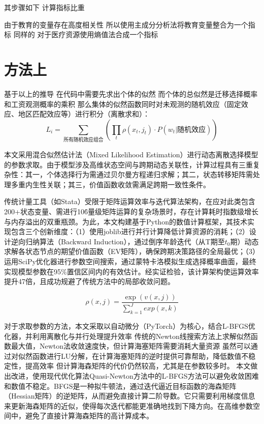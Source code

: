 \documentclass[a4paper,12pt,oneside]{book} %
\begin{document}
其步骤如下
计算指标比重


由于教育的变量存在高度相关性
所以使用主成分分析法将教育变量整合为一个指标
同样的
对于医疗资源使用熵值法合成一个指标

\section{方法上} %
\label{sub:方法上}
基于以上的推导
在代码中需要先求出个体的似然
而个体的总似然是迁移选择概率和工资观测概率的乘积
那么集体的似然函数同时对未观测的随机效应（固定效应、地区匹配效应等）进行积分（离散求和）：
\begin{equation}
  L_{i}=\sum\limits_{\text{所有随机效应组合}}(\prod_{t}\rho(x_{t},j_{t})⋅P(w_{t}|\text{随机效应}))
\end{equation}

本文采用混合似然估计法（Mixed Likelihood Estimation）进行动态离散选择模型的参数求取。由于模型涉及高维状态空间与跨期动态关联性，计算过程具有三重复杂性：其一，个体选择行为需通过贝尔曼方程递归求解；其二，状态转移矩阵需处理多重内生性关联；其三，价值函数收敛需满足跨期一致性条件。

传统计量工具（如Stata）受限于矩阵运算效率与迭代算法架构，在应对此类包含200+状态变量、需进行10\^6量级矩阵运算的复杂场景时，存在计算耗时指数级增长与内存溢出的双重瓶颈。为此，本文构建基于Python的数值计算框架，其技术实现包含三个创新维度：（1）使用joblib进行并行计算降低计算资源的消耗；（2）设计逆向归纳算法（Backward Induction），通过倒序年龄迭代（从T期至$t_0$期）动态求解各状态节点的期望价值函数（EV矩阵），确保跨期决策路径的全局最优；（3）运用SciPy优化器进行参数空间搜索，通过蒙特卡洛模拟生成选择概率曲面，最终实现模型参数在95\%置信区间内的有效估计。经实证检验，该计算架构使运算效率提升47倍，且成功规避了传统方法中的局部收敛问题。

\begin{equation}
  \rho(x,j)=\frac{\exp(v(x,j))}{\sum\limits_{k=1}^{J} exp(x,k)}
\end{equation}

对于求取参数的方法，本文采取以自动微分（PyTorch）为核心，结合L-BFGS优化器，并利用离散化与并行处理提升效率
传统的Newton线搜索方法上求解似然函数最大值，Newton法收敛速度快，但计算海塞矩阵需要消耗大量资源
虽然可以通过对似然函数进行LU分解，在计算海塞矩阵的逆时提供可靠帮助，降低数值不稳定性，提高效率
但计算海森矩阵的代价仍然较高，尤其是在参数较多时。
本文做出改进，使用现代优化算法Quasi-Newton方法中的L-BFGS方法可以避免收敛困难和数值不稳定。BFGS是一种拟牛顿法，通过迭代逼近目标函数的海森矩阵（Hessian矩阵）的逆矩阵，从而避免直接计算二阶导数。它只需要利用梯度信息来更新海森矩阵的近似，使得每次迭代都能更准确地找到下降方向。在高维参数空间中，避免了直接计算海森矩阵的高计算成本。
\end{document}
